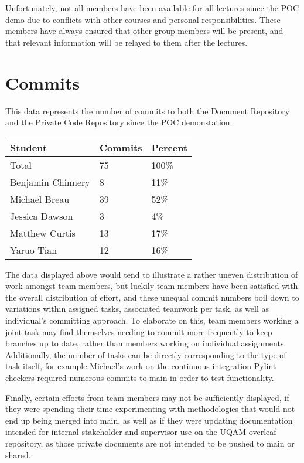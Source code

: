 \documentclass{article}
\begin{document}
Unfortunately, not all members have been available for all lectures since the POC demo due to conflicts with other courses and personal responsibilities. These members have always ensured that other group members will be present, and that relevant information will be relayed to them after the lectures.

\section{Commits}

This data represents the number of commits to both the Document Repository and the Private Code Repository since the POC demonstation. 
\begin{table}[H]
\centering
\begin{tabular}{lll}
\toprule
\textbf{Student} & \textbf{Commits} & \textbf{Percent}\\
\midrule
Total & 75 & 100\% \\
Benjamin Chinnery & 8 & 11\%\\
Michael Breau & 39 & 52\%\\
Jessica Dawson & 3 & 4\%\\
Matthew Curtis & 13 & 17\%\\
Yaruo Tian & 12 & 16\%\\
\bottomrule
\end{tabular}
\end{table}

The data displayed above would tend to illustrate a rather uneven distribution of work amongst team members, but luckily team members have been satisfied with the overall distribution of effort, and these unequal commit numbers boil down to variations within assigned tasks, associated teamwork per task, as well as individual's committing approach. To elaborate on this, team members working a joint task may find themselves needing to commit more frequently to keep branches up to date, rather than members working on individual assignments. Additionally, the number of tasks can be directly corresponding to the type of task itself, for example Michael's work on the continuous integration Pylint checkers required numerous commits to main in order to test functionality.

Finally, certain efforts from team members may not be sufficiently displayed, if they were spending their time experimenting with methodologies that would not end up being merged into main, as well as if they were updating documentation intended for internal stakeholder and supervisor use on the UQAM overleaf repository, as those private documents are not intended to be pushed to main or shared.
\end{document}
